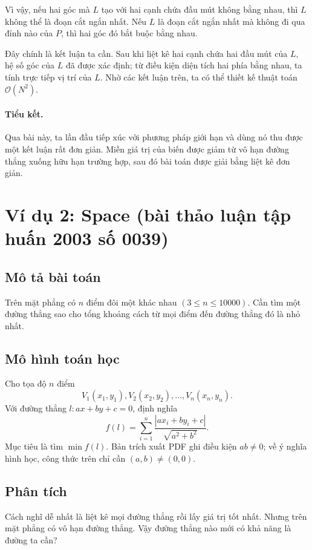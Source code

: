 \documentclass[11pt]{article}
\newcommand{\Oh}{\mathcal{O}}
\newcommand{\abs}[1]{\left|#1\right|}
\begin{document}
Vì vậy, nếu hai góc mà \(L\) tạo với hai cạnh chứa đầu mút không bằng nhau, thì
\(L\) không thể là đoạn cắt ngắn nhất. Nếu \(L\) là đoạn cắt ngắn nhất mà không
đi qua đỉnh nào của \(P\), thì hai góc đó bắt buộc bằng nhau.

Đây chính là kết luận ta cần. Sau khi liệt kê hai cạnh chứa hai đầu mút của
\(L\), hệ số góc của \(L\) đã được xác định; từ điều kiện diện tích hai phía
bằng nhau, ta tính trực tiếp vị trí của \(L\). Nhờ các kết luận trên, ta có thể
thiết kế thuật toán \(\Oh(N^2)\).

\paragraph{Tiểu kết.}
Qua bài này, ta lần đầu tiếp xúc với phương pháp giới hạn và dùng nó thu được
một kết luận rất đơn giản. Miền giá trị của biến được giảm từ vô hạn đường
thẳng xuống hữu hạn trường hợp, sau đó bài toán được giải bằng liệt kê đơn
giản.

\section{Ví dụ 2: Space (bài thảo luận tập huấn 2003 số 0039)}

\subsection*{Mô tả bài toán}

Trên mặt phẳng có \(n\) điểm đôi một khác nhau \((3\le n\le 10000)\). Cần tìm
một đường thẳng sao cho tổng khoảng cách từ mọi điểm đến đường thẳng đó là nhỏ
nhất.

\subsection*{Mô hình toán học}

Cho tọa độ \(n\) điểm
\[
  V_1(x_1,y_1),V_2(x_2,y_2),\ldots,V_n(x_n,y_n).
\]
Với đường thẳng \(l: ax+by+c=0\), định nghĩa
\[
  f(l)=\sum_{i=1}^n
  \frac{\abs{ax_i+by_i+c}}{\sqrt{a^2+b^2}}.
\]
Mục tiêu là tìm \(\min f(l)\). Bản trích xuất PDF ghi điều kiện \(ab\ne0\);
về ý nghĩa hình học, công thức trên chỉ cần \((a,b)\ne(0,0)\).

\subsection*{Phân tích}

Cách nghĩ dễ nhất là liệt kê mọi đường thẳng rồi lấy giá trị tốt nhất. Nhưng
trên mặt phẳng có vô hạn đường thẳng. Vậy đường thẳng nào mới có khả năng là
đường ta cần?
\end{document}
